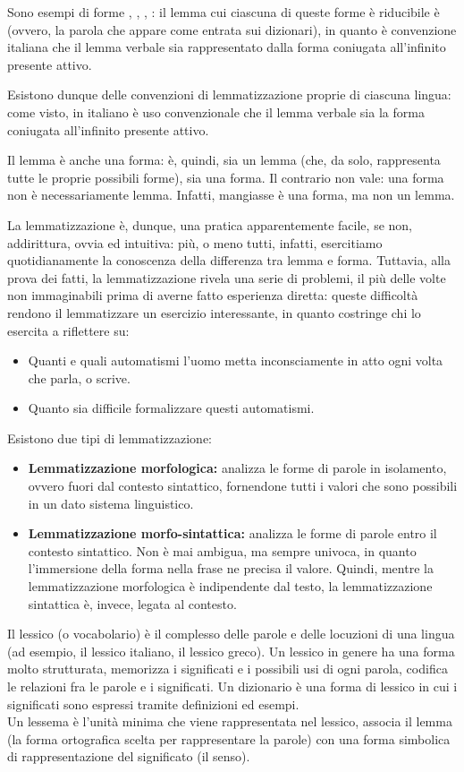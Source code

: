 \documentclass{article}
\theoremstyle{plain}
\theoremstyle{definition}
\begin{document}
Sono esempi di forme , , , : il lemma cui ciascuna di queste forme è riducibile è  (ovvero, la parola che appare come entrata sui dizionari), in quanto è convenzione italiana che il lemma verbale sia rappresentato dalla forma coniugata all'infinito presente attivo.

Esistono dunque delle convenzioni di lemmatizzazione proprie di ciascuna lingua: come visto, in italiano è uso convenzionale che il lemma verbale sia la forma coniugata all'infinito presente attivo.

Il lemma è anche una forma:  è, quindi, sia un lemma (che, da solo, rappresenta tutte le proprie possibili forme), sia una forma. Il contrario non vale: una forma non è necessariamente lemma. Infatti, mangiasse è una forma, ma non un lemma.

La lemmatizzazione è, dunque, una pratica apparentemente facile, se non, addirittura, ovvia ed intuitiva: più, o meno tutti, infatti, esercitiamo quotidianamente la conoscenza della differenza tra lemma e forma. Tuttavia,
alla prova dei fatti, la lemmatizzazione rivela una serie di problemi, il più delle volte non immaginabili prima di averne fatto esperienza diretta: queste difficoltà rendono il lemmatizzare un esercizio interessante, in quanto costringe chi lo esercita a riflettere su:

\begin{itemize}  
\item Quanti e quali automatismi l'uomo metta inconsciamente in atto ogni
volta che parla, o scrive.
\item Quanto sia difficile formalizzare questi automatismi.
\end{itemize}

Esistono due tipi di lemmatizzazione:

\begin{itemize}  
\item \textbf{Lemmatizzazione morfologica:} analizza le forme di parole in isolamento, ovvero fuori
dal contesto sintattico, fornendone tutti i valori che sono possibili in
un dato sistema linguistico.
\item \textbf{Lemmatizzazione morfo-sintattica:} analizza le forme di parole entro il contesto sintattico. Non è mai ambigua, ma sempre univoca, in quanto l'immersione della forma nella frase ne precisa il valore. Quindi, mentre la lemmatizzazione morfologica è indipendente dal testo, la lemmatizzazione
sintattica è, invece, legata al contesto.
\end{itemize}
Il lessico (o vocabolario) è il complesso delle parole e delle locuzioni di una lingua (ad esempio, il lessico italiano, il lessico greco). Un lessico in genere ha una forma molto strutturata, memorizza i significati e i possibili usi di ogni parola, codifica le relazioni fra le parole e i significati. Un dizionario è una forma di lessico in cui i significati sono espressi tramite definizioni ed esempi.
\\
Un lessema è l'unità minima che viene rappresentata nel lessico, associa
il lemma (la forma ortografica scelta per rappresentare la parole) con una forma simbolica di rappresentazione del significato (il senso).
\end{document}
